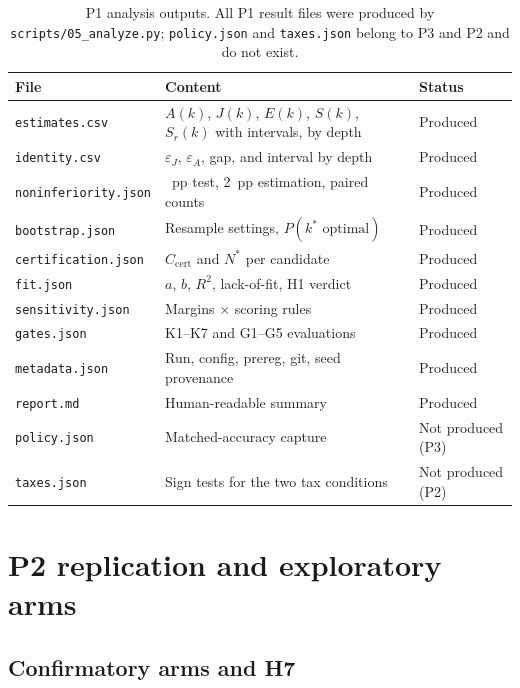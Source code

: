 \begin{table}[pos=htbp]
  \centering
  \caption{P1 analysis outputs. All P1 result files were produced by
  \texttt{scripts/05\_analyze.py}; \texttt{policy.json} and \texttt{taxes.json} belong to P3 and
  P2 and do not exist.}
  \label{tab:outputs}
  \small
  \begin{tabularx}{\textwidth}{>{\raggedright\arraybackslash}p{4.0cm}>{\raggedright\arraybackslash}p{6.3cm}>{\raggedright\arraybackslash}X}
    \toprule
    \textbf{File} & \textbf{Content} & \textbf{Status} \\
    \midrule
    \texttt{estimates.csv} & $A(k)$, $J(k)$, $E(k)$, $S(k)$, $S_r(k)$ with intervals, by depth & Produced \\
    \texttt{identity.csv} & $\varepsilon_J$, $\varepsilon_A$, gap, and interval by depth & Produced \\
    \texttt{noninferiority.json} & 5~pp test, 2~pp estimation, paired counts & Produced \\
    \texttt{bootstrap.json} & Resample settings, $P(k^{*}\text{ optimal})$ & Produced \\
    \texttt{certification.json} & $C_{\mathrm{cert}}$ and $N^{*}$ per candidate & Produced \\
    \texttt{fit.json} & $a$, $b$, $R^2$, lack-of-fit, H1 verdict & Produced \\
    \texttt{sensitivity.json} & Margins $\times$ scoring rules & Produced \\
    \texttt{gates.json} & K1--K7 and G1--G5 evaluations & Produced \\
    \texttt{metadata.json} & Run, config, prereg, git, seed provenance & Produced \\
    \texttt{report.md} & Human-readable summary & Produced \\
    \texttt{policy.json} & Matched-accuracy capture & Not produced (P3) \\
    \texttt{taxes.json} & Sign tests for the two tax conditions & Not produced (P2) \\
    \bottomrule
  \end{tabularx}
\end{table}

\section{P2 replication and exploratory arms}\label{sec:s8}

\subsection{Confirmatory arms and H7}

